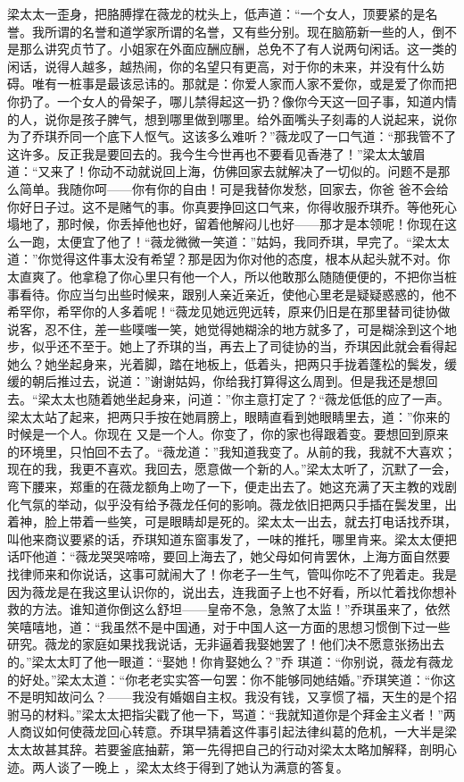 \documentclass{article}
\begin{document}
梁太太一歪身，把胳膊撑在薇龙的枕头上，低声道：“一个女人，顶要紧的是名誉。我所谓的名誉和道学家所谓的名誉，又有些分别。现在脑筋新一些的人，倒不是那么讲究贞节了。小姐家在外面应酬应酬，总免不了有人说两句闲话。这一类的闲话，说得人越多，越热闹，你的名望只有更高，对于你的未来，并没有什么妨碍。唯有一桩事是最该忌讳的。那就是：你爱人家而人家不爱你，或是爱了你而把你扔了。一个女人的骨架子，哪儿禁得起这一扔？像你今天这一回子事，知道内情的人，说你是孩子脾气，想到哪里做到哪里。给外面嘴头子刻毒的人说起来，说你为了乔琪乔同一个底下人怄气。这该多么难听？”薇龙叹了一口气道：“那我管不了这许多。反正我是要回去的。我今生今世再也不要看见香港了！”梁太太皱眉道：“又来了！你动不动就说回上海，仿佛回家去就解决了一切似的。问题不是那么简单。我随你呵——你有你的自由！可是我替你发愁，回家去，你爸
\newpage
爸不会给你好日子过。这不是赌气的事。你真要挣回这口气来，你得收服乔琪乔。等他死心塌地了，那时候，你丢掉他也好，留着他解闷儿也好——那才是本领呢！你现在这么一跑，太便宜了他了！“薇龙微微一笑道：”姑妈，我同乔琪，早完了。“梁太太道：”你觉得这件事太没有希望？那是因为你对他的态度，根本从起头就不对。你太直爽了。他拿稳了你心里只有他一个人，所以他敢那么随随便便的，不把你当桩事看待。你应当匀出些时候来，跟别人亲近亲近，使他心里老是疑疑惑惑的，他不希罕你，希罕你的人多着呢！“薇龙见她远兜远转，原来仍旧是在那里替司徒协做说客，忍不住，差一些噗嗤一笑，她觉得她糊涂的地方就多了，可是糊涂到这个地步，似乎还不至于。她上了乔琪的当，再去上了司徒协的当，乔琪因此就会看得起她么？她坐起身来，光着脚，踏在地板上，低着头，把两只手拢着蓬松的鬓发，缓缓的朝后推过去，说道：”谢谢姑妈，你给我打算得这么周到。但是我还是想回去。“梁太太也随着她坐起身来，问道：”你主意打定了？“薇龙低低的应了一声。梁太太站了起来，把两只手按在她肩膀上，眼睛直看到她眼睛里去，道：”你来的时候是一个人。你现在
\newpage
又是一个人。你变了，你的家也得跟着变。要想回到原来的环境里，只怕回不去了。“薇龙道：”我知道我变了。从前的我，我就不大喜欢；现在的我，我更不喜欢。我回去，愿意做一个新的人。”梁太太听了，沉默了一会，弯下腰来，郑重的在薇龙额角上吻了一下，便走出去了。她这充满了天主教的戏剧化气氛的举动，似乎没有给予薇龙任何的影响。薇龙依旧把两只手插在鬓发里，出着神，脸上带着一些笑，可是眼睛却是死的。梁太太一出去，就去打电话找乔琪，叫他来商议要紧的话，乔琪知道东窗事发了，一味的推托，哪里肯来。梁太太便把话吓他道：“薇龙哭哭啼啼，要回上海去了，她父母如何肯罢休，上海方面自然要找律师来和你说话，这事可就闹大了！你老子一生气，管叫你吃不了兜着走。我是因为薇龙是在我这里认识你的，说出去，连我面子上也不好看，所以忙着找你想补救的方法。谁知道你倒这么舒坦——皇帝不急，急煞了太监！”乔琪虽来了，依然笑嘻嘻地，道：“我虽然不是中国通，对于中国人这一方面的思想习惯倒下过一些研究。薇龙的家庭如果找我说话，无非逼着我娶她罢了！他们决不愿意张扬出去的。”梁太太盯了他一眼道：“娶她！你肯娶她么？”乔
\newpage
琪道：“你别说，薇龙有薇龙的好处。”梁太太道：“你老老实实答一句罢：你不能够同她结婚。”乔琪笑道：“你这不是明知故问么？——我没有婚姻自主权。我没有钱，又享惯了福，天生的是个招驸马的材料。”梁太太把指尖戳了他一下，骂道：“我就知道你是个拜金主义者！”两人商议如何使薇龙回心转意。乔琪早猜着这件事引起法律纠葛的危机，一大半是梁太太故甚其辞。若要釜底抽薪，第一先得把自己的行动对梁太太略加解释，剖明心迹。两人谈了一晚上
，梁太太终于得到了她认为满意的答复。 
\end{document}
